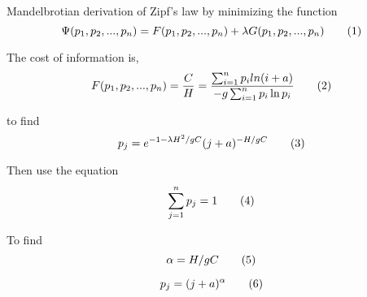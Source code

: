 Mandelbrotian derivation of Zipf's law by minimizing the function
\[
  \Psi(p_1, p_2, ..., p_n)
  =
  F(p_1, p_2, ..., p_n)
  +
  \lambda G(p_1, p_2, ..., p_n)
  \addtag
\]

The cost of information is,
\[
  F(p_1, p_2, ..., p_n)
  =
  \frac{C}{H}
  =
  \frac{
    \sum_{i=1}^{n}
      p_i
      ln(i + a)
  }{
    -g
    \sum_{i=1}^{n}
      p_i \ln p_i
  }
  \addtag
\]

to find
\[
  p_j
  =
  e^{
    -1 - 
    \lambda H^2 / gC
  }
  (j + a)^{
    -H / gC
  }
  \addtag
\]

Then use the equation
\[
  \sum_{j=1}^{n}
    p_j
  = 1
  \addtag
\]

To find
\[
  \alpha = H / gC
  \addtag
\]

\[
  p_j = (j + a)^\alpha
  \addtag
\]